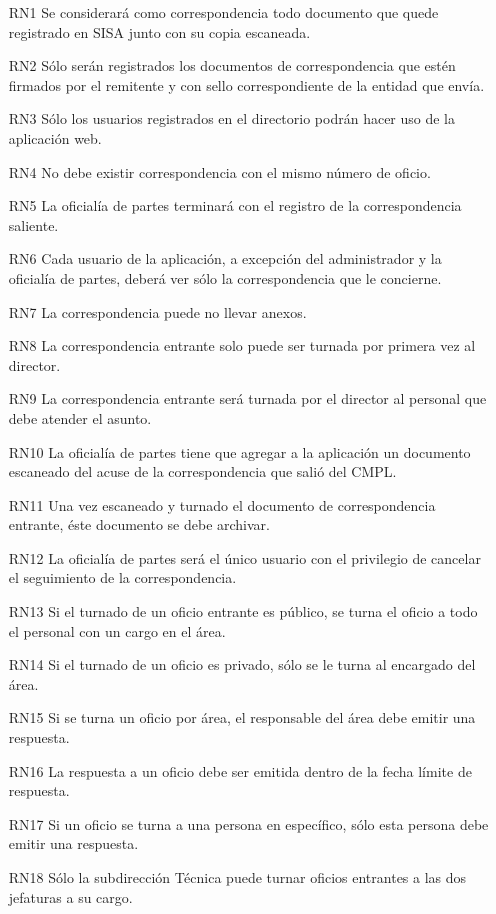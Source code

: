 \begin{itemize}
	\item[RN1] Se considerará como correspondencia todo documento que quede registrado en SISA junto con su copia escaneada.
	\item[RN2] Sólo serán registrados los documentos de correspondencia que estén firmados por el remitente y con sello correspondiente de la entidad que envía.
	\item[RN3] Sólo los usuarios registrados en el directorio podrán hacer uso de la aplicación web.
	\item[RN4] No debe existir correspondencia con el mismo número de oficio.
	\item[RN5] La oficialía de partes terminará con el registro de la correspondencia saliente.
	\item[RN6] Cada usuario de la aplicación, a excepción del administrador y la oficialía de partes, deberá ver sólo la correspondencia que le concierne.
	\item[RN7] La correspondencia puede no llevar anexos. 
	\item[RN8] La correspondencia entrante solo puede ser turnada por primera vez al director.
	\item[RN9] La correspondencia entrante será turnada por el director al personal que debe atender el asunto.
	\item[RN10] La oficialía de partes tiene que agregar a la aplicación un documento escaneado del acuse de la correspondencia que salió del CMPL.
	\item[RN11] Una vez escaneado y turnado el documento de correspondencia entrante, éste documento se debe archivar.
	\item[RN12] La oficialía de partes será el único usuario con el privilegio de cancelar el seguimiento de la correspondencia.
	\item[RN13] Si el turnado de un oficio entrante es público, se turna el oficio a todo el personal con un cargo en el área.
	\item[RN14] Si el turnado de un oficio es privado, sólo se le turna al encargado del área.
	\item[RN15] Si se turna un oficio por área, el responsable del área debe emitir una respuesta.
	\item[RN16] La respuesta a un oficio debe ser emitida dentro de la fecha límite de respuesta.
	\item[RN17] Si un oficio se turna a una persona en específico, sólo esta persona debe emitir una respuesta.
	\item[RN18] Sólo la subdirección Técnica puede turnar oficios entrantes a las dos jefaturas a su cargo.

\end{itemize}
